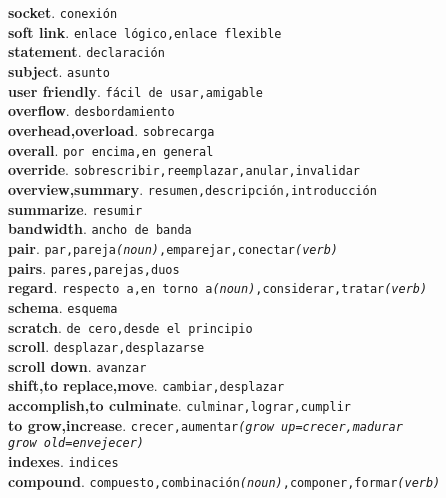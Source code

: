 \documentclass[twocolumn]{article}
\begin{document}
	\textsf{\textbf{socket}}. \texttt{conexi\'on}\\
	\textsf{\textbf{soft link}}. \texttt{enlace l\'ogico,enlace flexible}\\
	\textsf{\textbf{statement}}. \texttt{declaraci\'on}\\
	\textsf{\textbf{subject}}. \texttt{asunto}\\
	\textsf{\textbf{user friendly}}. \texttt{f\'acil de usar,amigable}\\
	\textsf{\textbf{overflow}}. \texttt{desbordamiento}\\
	\textsf{\textbf{overhead,overload}}. \texttt{sobrecarga}\\
	\textsf{\textbf{overall}}. \texttt{por encima,en general}\\
	\textsf{\textbf{override}}. \texttt{sobrescribir,reemplazar,anular,invalidar}\\
	\textsf{\textbf{overview,summary}}. \texttt{resumen,descripci\'on,introducci\'on}\\
	\textsf{\textbf{summarize}}. \texttt{resumir}\\
	\textsf{\textbf{bandwidth}}. \texttt{ancho de banda}\\
	\textsf{\textbf{pair}}. \texttt{par,pareja{\scriptsize \textsl{(noun)}},emparejar,conectar{\scriptsize \textsl{(verb)}}}\\
	\textsf{\textbf{pairs}}. \texttt{pares,parejas,duos}\\
	\textsf{\textbf{regard}}. \texttt{respecto a,en torno a{\scriptsize \textsl{(noun)}},considerar,tratar{\scriptsize \textsl{(verb)}}}\\
	\textsf{\textbf{schema}}. \texttt{esquema}\\
	\textsf{\textbf{scratch}}. \texttt{de cero,desde el principio}\\
	\textsf{\textbf{scroll}}. \texttt{desplazar,desplazarse}\\
	\textsf{\textbf{scroll down}}. \texttt{avanzar}\\
	\textsf{\textbf{shift,to replace,move}}. \texttt{cambiar,desplazar}\\
	\textsf{\textbf{accomplish,to culminate}}. \texttt{culminar,lograr,cumplir}\\
	\textsf{\textbf{to grow,increase}}. \texttt{crecer,aumentar{\scriptsize \textsl{(grow up=crecer,madurar\\grow old=envejecer)}}}\\
	\textsf{\textbf{indexes}}. \texttt{indices}\\
	\textsf{\textbf{compound}}. \texttt{compuesto,combinaci\'on{\scriptsize \textsl{(noun)}},componer,formar{\scriptsize \textsl{(verb)}}}\\
\end{document}
